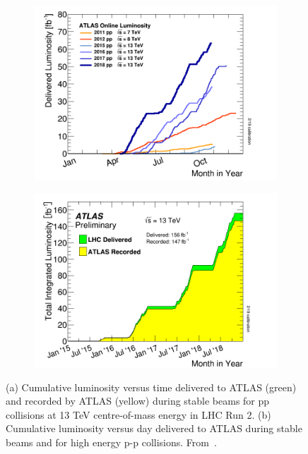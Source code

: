 \begin{figure}[]
    \centering
    \begin{subfigure}[b]{0.49\textwidth}
        \centering
        \includegraphics[width=\textwidth]{images/intlumivsyear.png}
        \caption{}
        \label{fig:method:Lumi:lumirun2year}
    \end{subfigure}
    \begin{subfigure}[b]{0.49\textwidth}
        \centering
        \includegraphics[width=\textwidth]{images/intlumivstimeRun2.png}
        \caption{}
        \label{fig:method:Lumi:lumiRun2vsatlas}
    \end{subfigure}
    \caption[Total Integrated Luminosity at Run 2 (13 TeV pp data only);
    Delivered Luminosity versus time for 2011-2018 (p-p data only)]{(a) Cumulative luminosity versus time delivered to ATLAS (green) and recorded by ATLAS (yellow) during stable beams for pp collisions at 13 TeV centre-of-mass energy in LHC Run 2. (b) Cumulative luminosity versus day delivered to ATLAS during stable beams and for high energy p-p collisions.
    From~\cite{ATLAS:lumiPlots}.}
    \label{}
\end{figure}

\clearpage